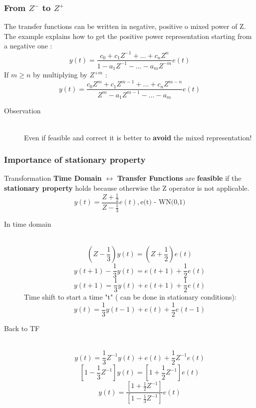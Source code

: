 \subsubsection{From $Z^{-}$ to $Z^{+}$ }
The transfer functions can be written in negative, positive o mixed power of Z.
The example explains how to get the positive power representation starting from a negative one :
$$ y(t)= \frac{c_0+c_1Z^{-1}+...+c_nZ^{n}}{1-a_1Z^{-1}-...-a_mZ^{-m}} e(t)$$
If $ m \geq n $ by multiplying by $Z^{+m}$ : 
$$ y(t)= \frac{c_0Z^m+c_1Z^{m-1}+...+c_nZ^{m-n}}{Z^m-a_1Z^{m-1}-...-a_m} e(t)$$
\begin{description}
\item[Observation]\hfill\\
Even if feasible and correct it is better to \textbf{avoid} the mixed representation!
\end{description}
\newpage
\subsubsection{Importance of stationary property}
Transformation \textbf{Time Domain} $ \leftrightarrow $ \textbf{Transfer Functions} are \textbf{feasible} if the \textbf{stationary property} holds because otherwise the Z operator is not applicable.\\
$$ y(t) = \frac{Z+\frac{1}{2}}{Z-\frac{1}{3}}e(t) , \text{e(t) - WN(0,1)} $$
\begin{description}
\item[In time domain]\hfill\\
$$(Z-\frac{1}{3})y(t) = (Z+\frac{1}{2})e(t) $$
$$ y(t+1)-\frac{1}{3}y(t) = e(t+1)+\frac{1}{2}e(t) $$
$$y(t+1) = \frac{1}{3}y(t) + e(t+1)+\frac{1}{2}e(t) $$
Time shift to start a time "t" ( can be done in stationary conditions):
$$y(t) = \frac{1}{3}y(t-1) + e(t)+\frac{1}{2}e(t-1) $$
\item[Back to TF]\hfill\\
$$y(t) = \frac{1}{3}Z^{-1}y(t) + e(t)+\frac{1}{2}Z^{-1}e(t) $$
$$[1-\frac{1}{3}Z^{-1}]y(t) = [1+\frac{1}{2}Z^{-1}]e(t) $$
$$y(t) = \frac{[1+\frac{1}{2}Z^{-1}]}{[1-\frac{1}{3}Z^{-1}]} e(t) $$
\end{description}

\newpage
